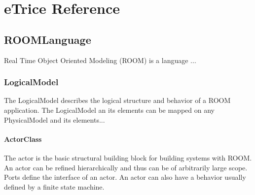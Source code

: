 \chapter{eTrice Reference}
\section{ROOMLanguage}
	Real Time Object Oriented Modeling (ROOM) is a language ... 
	
		\subsection{LogicalModel}
		The LogicalModel describes the logical structure and behavior of a ROOM application. The LogicalModel an its elements can be mapped on any PhysicalModel and its elements...
	
		
		
		\subsubsection{ActorClass}
			\hypertarget{ref:ActorClass}{}
			
			The actor is the basic structural building block for building systems with ROOM. An actor can be refined hierarchically and thus can be of arbitrarily large scope. Ports define the interface of an actor. An actor can also have a behavior usually defined by a finite state machine. 
			

